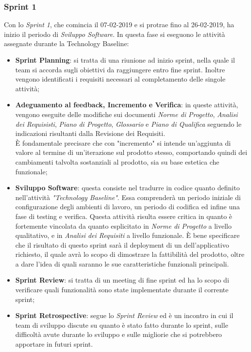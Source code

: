 \clearpage
\subsubsection{Sprint 1}
Con lo \emph{Sprint 1}, che comincia il 07-02-2019 e si protrae fino al 26-02-2019, ha inizio il periodo di \emph{Sviluppo Software}. In questa fase si eseguono le attività assegnate durante la Technology Baseline:   
	\begin{itemize}
		\item \textbf{Sprint Planning}: si tratta di una riunione ad inizio sprint, nella quale il team si accorda sugli obiettivi da raggiungere entro fine sprint. Inoltre vengono identificati i requisiti necessari al completamento delle singole attività;
		\item \textbf{Adeguamento al feedback, Incremento e Verifica}: in queste attività, vengono eseguite delle modifiche sui documenti \emph{Norme di Progetto}, \emph{Analisi dei Requisisti}, \emph{Piano di Progetto}, \emph{Glossario} e \emph{Piano di Qualifica} seguendo le indicazioni risultanti dalla Revisione dei Requisiti. \\ 	\`E fondamentale precisare che con "incremento" si intende un'aggiunta di valore al termine di un'iterazione sul prodotto stesso, comportando quindi dei cambiamenti talvolta sostanziali al prodotto, sia su base estetica che funzionale;
		\item \textbf{Sviluppo Software}: questa  consiste nel tradurre in codice quanto definito nell'attività \emph{"Technology Baseline"}. Essa comprenderà un periodo iniziale di configurazione degli ambienti di lavoro, un periodo di codifica ed infine una fase di testing e verifica. Questa attività risulta essere critica in quanto è fortemente vincolata da quanto esplicitato in \emph{Norme di Progetto} a livello qualitativo, e in \emph{Analisi dei Requisiti} a livello funzionale. \`E bene specificare che il risultato di questo sprint sarà il deployment di un  dell'applicativo richiesto, il quale avrà lo scopo di dimostrare la fattibilità del prodotto, oltre a dare l'idea di quali saranno le sue caratteristiche funzionali principali.
		\item \textbf{Sprint Review}: si tratta di un meeting di fine sprint ed ha lo scopo di verificare quali funzionalità sono state implementate durante il corrente sprint;
		\item \textbf{Sprint Retrospective}: segue lo \emph{Sprint Review} ed è un incontro in cui il team di sviluppo discute su quanto è stato fatto durante lo sprint, sulle difficoltà avute durante lo sviluppo e sulle migliorie che si potrebbero apportare in futuri sprint.
	\end{itemize}
